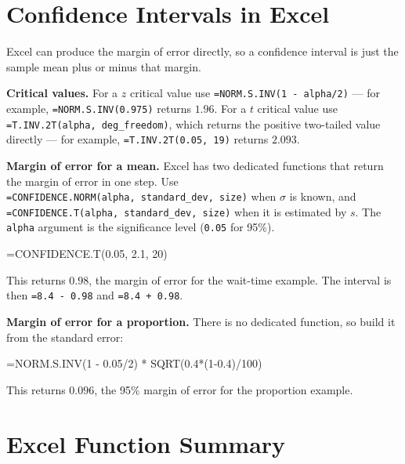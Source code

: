 \documentclass[
  11pt,
  letterpaper,
  DIV=11,
  numbers=noendperiod,
  oneside,
  open=any]{scrreprt}
\newenvironment{Shaded}{\begin{snugshade}}{\end{snugshade}}
\newcommand{\NormalTok}[1]{\textcolor[rgb]{0.00,0.23,0.31}{#1}}
\begin{document}
\section{Confidence Intervals in
Excel}\label{confidence-intervals-in-excel}

Excel can produce the margin of error directly, so a confidence interval
is just the sample mean plus or minus that margin.

\textbf{Critical values.} For a \(z\) critical value use
\texttt{=NORM.S.INV(1\ -\ alpha/2)} --- for example,
\texttt{=NORM.S.INV(0.975)} returns \(1.96\). For a \(t\) critical value
use \texttt{=T.INV.2T(alpha,\ deg\_freedom)}, which returns the positive
two-tailed value directly --- for example, \texttt{=T.INV.2T(0.05,\ 19)}
returns \(2.093\).

\textbf{Margin of error for a mean.} Excel has two dedicated functions
that return the margin of error in one step. Use
\texttt{=CONFIDENCE.NORM(alpha,\ standard\_dev,\ size)} when \(\sigma\)
is known, and \texttt{=CONFIDENCE.T(alpha,\ standard\_dev,\ size)} when
it is estimated by \(s\). The \texttt{alpha} argument is the
significance level (\texttt{0.05} for 95\%).

\begin{Shaded}
\begin{Highlighting}[]
\NormalTok{=CONFIDENCE.T(0.05, 2.1, 20)}
\end{Highlighting}
\end{Shaded}

This returns \(0.98\), the margin of error for the wait-time example.
The interval is then \texttt{=8.4\ -\ 0.98} and \texttt{=8.4\ +\ 0.98}.

\textbf{Margin of error for a proportion.} There is no dedicated
function, so build it from the standard error:

\begin{Shaded}
\begin{Highlighting}[]
\NormalTok{=NORM.S.INV(1 {-} 0.05/2) * SQRT(0.4*(1{-}0.4)/100)}
\end{Highlighting}
\end{Shaded}

This returns \(0.096\), the 95\% margin of error for the proportion
example.

\section{Excel Function Summary}\label{excel-function-summary-9}
\end{document}
